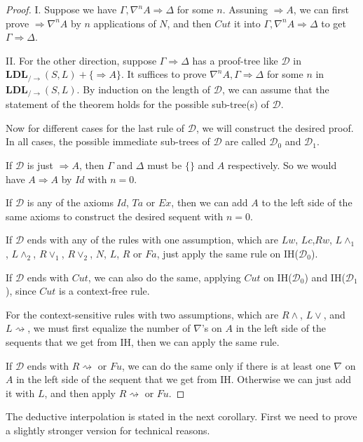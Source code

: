 \documentclass[12pt,a4paper]{article}
\theoremstyle{plain}
\theoremstyle{definition}
\begin{document}
\begin{proof}
	I. Suppose we have $\Gamma, \nabla^n A \Rightarrow \Delta$ for some $n$. Assuning $\Rightarrow A$, we can first prove $\Rightarrow \nabla^n A$ by $n$ applications of $N$, and then $Cut$ it into $\Gamma, \nabla^n A \Rightarrow \Delta$ to get $\Gamma \Rightarrow \Delta$.

	II. For the other direction, suppose $\Gamma \Rightarrow \Delta$ has a proof-tree like $\mathcal{D}$ in $\mathbf{LDL}_{/\rightarrow}(S,L)+\{\Rightarrow A\}$. It suffices to prove $\nabla^n A, \Gamma \Rightarrow \Delta$ for some $n$ in $\mathbf{LDL}_{/\rightarrow}(S,L)$. By induction on the length of $\mathcal{D}$, we can assume that the statement of the theorem holds for the possible sub-tree(s) of $\mathcal{D}$.

	Now for different cases for the last rule of $\mathcal{D}$, we will construct the desired proof. In all cases, the possible immediate sub-trees of $\mathcal{D}$ are called $\mathcal{D}_0$ and $\mathcal{D}_1$.
	
	If $\mathcal{D}$ is just $\Rightarrow A$, then $\Gamma$ and $\Delta$ must be $\{\}$ and $A$ respectively. So we would have $A \Rightarrow A$ by $Id$ with $n = 0$.

	If $\mathcal{D}$ is any of the axioms $Id$, $Ta$ or $Ex$, then we can add $A$ to the left side of the same axioms to construct the desired sequent with $n = 0$.

	If $\mathcal{D}$ ends with any of the rules with one assumption, which are $Lw$, $Lc$,$Rw$, $L\land_1$, $L\land_2$, $R\lor_1$, $R\lor_2$, $N$, $L$, $R$ or $Fa$, just apply the same rule on IH($\mathcal{D}_0$).

	If $\mathcal{D}$ ends with $Cut$, we can also do the same, applying $Cut$ on IH($\mathcal{D}_0$) and IH($\mathcal{D}_1$), since $Cut$ is a context-free rule.

	For the context-sensitive rules with two assumptions, which are $R\land$, $L\lor$, and $L\rightsquigarrow$, we must first equalize the number of $\nabla$'s on $A$ in the left side of the sequents that we get from IH, then we can apply the same rule.

	If $\mathcal{D}$ ends with $R\rightsquigarrow$ or $Fu$, we can do the same only if there is at least one $\nabla$ on $A$ in the left side of the sequent that we get from IH. Otherwise we can just add it with $L$, and then apply $R\rightsquigarrow$ or $Fu$.
\end{proof}

The deductive interpolation is stated in the next corollary. First we need to prove a slightly stronger version for technical reasons.
\end{document}
